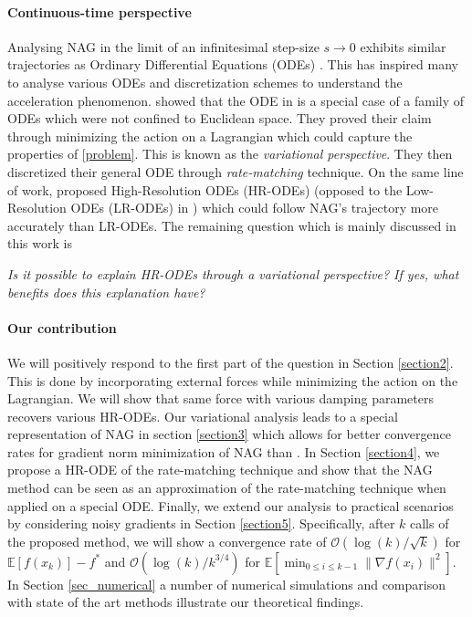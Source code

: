 \documentclass{article}
\theoremstyle{plain}
\theoremstyle{definition}
\theoremstyle{remark}
\newcommand{\aynote}[1]{\textcolor{red}{[\textbf{Note:} #1]}}
\begin{document}
\paragraph{Continuous-time perspective} 
Analysing NAG in the limit of an infinitesimal step-size $s \to 0$ exhibits similar trajectories as Ordinary Differential Equations (ODEs) \citep{JMLR:v17:15-084}. This has inspired many to analyse various ODEs and discretization schemes to understand the acceleration phenomenon. \citet{WibisonoE7351} showed that the ODE in \citep{JMLR:v17:15-084} is a special case of a family of ODEs which were not confined to Euclidean space. They proved their claim through minimizing the action on a Lagrangian which could capture the properties of \eqref{problem}. This is known as the \textit{variational perspective}. 
They then discretized their general ODE through \textit{rate-matching} technique. On the same line of work, \citet{Shi2021UnderstandingTA} proposed High-Resolution ODEs (HR-ODEs) (opposed to the Low-Resolution ODEs (LR-ODEs) in \citep{JMLR:v17:15-084}) which could follow NAG's trajectory more accurately than LR-ODEs. The remaining question which is mainly discussed in this work is
\begin{center}
   \textit{Is it possible to explain HR-ODEs through a variational perspective? If yes, what benefits does this explanation have?} 
\end{center}
\paragraph{Our contribution} We will positively respond to the first part of the question in Section \ref{section2}. This is done by incorporating external forces while minimizing the action on the Lagrangian. We will show that same force with various damping parameters recovers various HR-ODEs. Our variational analysis leads to a special representation of NAG in section \ref{section3} which allows for better convergence rates for gradient norm minimization of NAG than \citep{shi2019acceleration}. In Section \ref{section4}, we propose a HR-ODE of the rate-matching technique and show that the NAG method can be seen as an approximation of the rate-matching technique when applied on a special ODE. Finally, we extend our analysis to practical scenarios by considering noisy gradients in Section \ref{section5}. Specifically, after \(k\) calls of the proposed method, we will show a convergence rate of \(\mathcal O(\log(k)/\sqrt{k})\) for \(\mathbb E[f(x_k)]-f^*\) and \(\mathcal{O}(\log(k)/k^{3/4})\) for \(\mathbb E\left[\min_{0\leq i\leq k-1}\|\nabla f(x_i)\|^2 \right]\). In Section \ref{sec_numerical} a number of numerical simulations and comparison with state of the art methods illustrate our theoretical findings.
\end{document}

